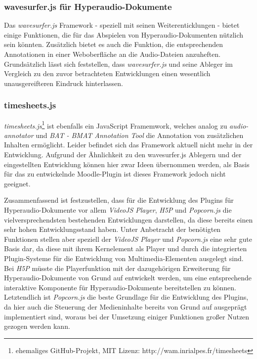 
\subsubsection{wavesurfer.js für Hyperaudio-Dokumente}
Das \textit{wavesurfer.js} Framework - speziell mit seinen Weiterenticklungen - bietet einige Funktionen, die für das Abspielen von Hyperaudio-Dokumenten nützlich sein könnten. Zusätzlich bietet es auch die Funktion,  die entsprechenden Annotationen in einer Weboberfläche an die Audio-Dateien anzuheften. Grundsätzlich lässt sich feststellen, dass \textit{wavesurfer.js} und seine Ableger im Vergleich zu den zuvor betrachteten Entwicklungen einen wesentlich unausgereifteren Eindruck hinterlassen.

\subsubsection{timesheets.js}
\textit{timesheets.js}\footnote{ehemaliges GitHub-Projekt, MIT Lizenz: http://wam.inrialpes.fr/timesheets} ist ebenfalls ein JavaScript Framemwork, welches analog zu \textit{audio-annotator} und \textit{BAT - BMAT Annotation Tool} die Annotation von zusätzlichen Inhalten ermöglicht. Leider befindet sich das Framework aktuell nicht mehr in der Entwicklung. Aufgrund der Ähnlichkeit zu den {wavesurfer.js} Ablegern und der eingestellten Entwicklung können hier zwar Ideen übernommen werden, als Basis für das zu entwickelnde Moodle-Plugin ist dieses Framework jedoch nicht geeignet.

Zusammenfassend ist festzustellen, dass für die Entwicklung des Plugins für Hyperaudio-Dokumente vor allem \textit{VideoJS Player}, \textit{H5P} und \textit{Popcorn.js} die vielversprechendsten bestehenden Entwicklungen darstellen, da diese bereits einen sehr hohen Entwicklungsstand haben. Unter Anbetracht der benötigten Funktionen stellen aber speziell der \textit{VideoJS Player} und \textit{Popcorn.js} eine sehr gute Basis dar, da diese mit ihrem Kernelement als Player und durch die integrierten Plugin-Systeme für die Entwicklung von Multimedia-Elementen ausgelegt sind. Bei \textit{H5P} müsste die Playerfunktion mit der dazugehörigen Erweiterung für Hyperaudio-Dokumente von Grund auf entwickelt werden, um eine entsprechende interaktive Komponente für Hyperaudio-Dokumente bereitstellen zu können. Letztendlich ist \textit{Popcorn.js} die beste Grundlage für die Entwicklung des Plugins, da hier auch die Steuerung der Medieninhalte bereits von Grund auf ausgeprägt implementiert sind, woraus bei der Umsetzung einiger Funktionen großer Nutzen gezogen werden kann.


